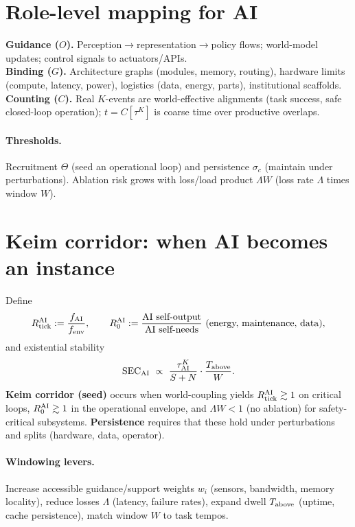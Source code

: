\documentclass[12pt,a4paper,oneside]{scrreprt}
\begin{document}
\section{Role-level mapping for AI}\label{sec:ai-mapping}
\textbf{Guidance ($O$).} Perception$\to$representation$\to$policy flows; world-model updates; control signals to actuators/APIs.\\
\textbf{Binding ($G$).} Architecture graphs (modules, memory, routing), hardware limits (compute, latency, power), logistics (data, energy, parts), institutional scaffolds.\\
\textbf{Counting ($C$).} Real $K$-events are world-effective alignments (task success, safe closed-loop operation); $t=C[\tau^K]$ is coarse time over productive overlaps.

\paragraph{Thresholds.}
Recruitment $\Theta$ (seed an operational loop) and persistence $\sigma_c$ (maintain under perturbations). 
Ablation risk grows with loss/load product $\Lambda W$ (loss rate $\Lambda$ times window $W$).

\section{Keim corridor: when AI becomes an instance}\label{sec:ai-keim-corridor}
Define
\[
R_{\rm tick}^{\rm AI}:=\frac{f_{\rm AI}}{f_{\rm env}},\qquad 
R_0^{\rm AI}:=\frac{\text{AI self-output}}{\text{AI self-needs}}\ (\text{energy, maintenance, data}),
\]
and existential stability
\[
\mathrm{SEC}_{\rm AI}\ \propto\ \frac{\tau^K_{\rm AI}}{S+N}\cdot\frac{T_{\rm above}}{W}.
\]
\textbf{Keim corridor (seed)} occurs when world-coupling yields $R_{\rm tick}^{\rm AI}\gtrsim 1$ on critical loops, $R_0^{\rm AI}\gtrsim 1$ in the operational envelope, and $\Lambda W<1$ (no ablation) for safety-critical subsystems. 
\textbf{Persistence} requires that these hold under perturbations and splits (hardware, data, operator).

\paragraph{Windowing levers.}
Increase accessible guidance/support weights $w_i$ (sensors, bandwidth, memory locality), reduce losses $\Lambda$ (latency, failure rates), expand dwell $T_{\rm above}$ (uptime, cache persistence), match window $W$ to task tempos.
\end{document}
